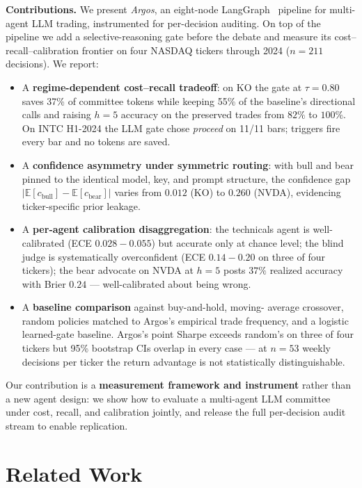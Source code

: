 \documentclass[conference]{IEEEtran}
\begin{document}
\textbf{Contributions.} We present \emph{Argos}, an eight-node
LangGraph~\cite{langgraph} pipeline for multi-agent LLM
trading, instrumented for per-decision auditing. On top of the
pipeline we add a selective-reasoning gate before the debate and
measure its cost--recall--calibration frontier on four NASDAQ tickers
through 2024 ($n{=}211$ decisions). We report:
\begin{itemize}\itemsep1pt
  \item A \textbf{regime-dependent cost--recall tradeoff}: on KO the
  gate at $\tau{=}0.80$ saves 37\% of committee tokens while keeping
  55\% of the baseline's directional calls and raising $h{=}5$
  accuracy on the preserved trades from $82\%$ to $100\%$. On INTC
  H1-2024 the LLM gate chose \emph{proceed} on 11/11 bars; triggers
  fire every bar and no tokens are saved.
  \item A \textbf{confidence asymmetry under symmetric routing}: with
  bull and bear pinned to the identical model, key, and prompt
  structure, the confidence gap
  $|\mathbb{E}[c_{\text{bull}}]{-}\mathbb{E}[c_{\text{bear}}]|$
  varies from $0.012$ (KO) to $0.260$ (NVDA), evidencing
  ticker-specific prior leakage.
  \item A \textbf{per-agent calibration disaggregation}: the
  technicals agent is well-calibrated (ECE $0.028{-}0.055$) but
  accurate only at chance level; the blind judge is systematically
  overconfident (ECE $0.14{-}0.20$ on three of four tickers); the
  bear advocate on NVDA at $h{=}5$ posts $37\%$ realized accuracy
  with Brier $0.24$ --- well-calibrated about being wrong.
  \item A \textbf{baseline comparison} against buy-and-hold, moving-
  average crossover, random policies matched to Argos's empirical
  trade frequency, and a logistic learned-gate baseline. Argos's
  point Sharpe exceeds random's on three of four tickers but 95\%
  bootstrap CIs overlap in every case --- at $n{=}53$ weekly
  decisions per ticker the return advantage is not statistically
  distinguishable.
\end{itemize}

Our contribution is a \textbf{measurement framework and instrument}
rather than a new agent design: we show how to evaluate a multi-agent
LLM committee under cost, recall, and calibration jointly, and
release the full per-decision audit stream to enable replication.

\section{Related Work}
\end{document}
